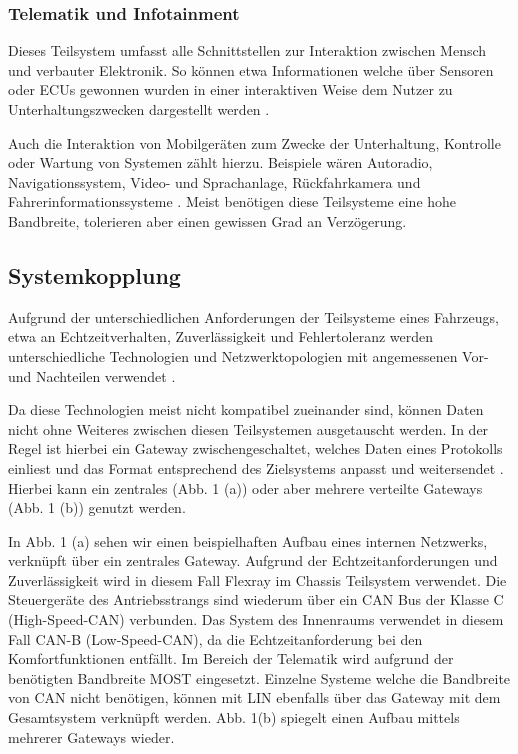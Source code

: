         \subsubsection{Telematik und Infotainment}
        Dieses Teilsystem umfasst alle Schnittstellen zur Interaktion zwischen Mensch und verbauter Elektronik. So können etwa Informationen welche über Sensoren
        oder ECUs gewonnen wurden in einer interaktiven Weise dem Nutzer zu Unterhaltungszwecken dargestellt werden \cite{TW_huang2018vehicle}.
        
        Auch die Interaktion von Mobilgeräten
        zum Zwecke der Unterhaltung, Kontrolle oder Wartung von Systemen zählt hierzu. Beispiele wären Autoradio, Navigationssystem, Video- und Sprachanlage, Rückfahrkamera und Fahrerinformationssysteme \cite{reif2011bosch}.
        Meist benötigen diese Teilsysteme eine hohe Bandbreite, tolerieren aber einen gewissen Grad an Verzögerung.
    \subsection{Systemkopplung}
    Aufgrund der unterschiedlichen Anforderungen der Teilsysteme eines Fahrzeugs, etwa an Echtzeitverhalten, Zuverlässigkeit und Fehlertoleranz werden unterschiedliche Technologien
    und Netzwerktopologien mit angemessenen Vor- und Nachteilen verwendet \cite{leen1999digital}. 
    
    Da diese Technologien meist nicht kompatibel zueinander sind, können Daten nicht ohne Weiteres zwischen diesen
    Teilsystemen ausgetauscht werden. In der Regel ist hierbei ein Gateway zwischengeschaltet, welches Daten eines Protokolls einliest und das Format entsprechend des Zielsystems anpasst
    und weitersendet \cite{reif2011bosch}\cite{TW_kim2014gateway}. Hierbei kann ein zentrales (Abb. 1 (a)) oder aber mehrere verteilte Gateways (Abb. 1 (b)) genutzt werden. 

    In Abb. 1 (a) sehen wir einen beispielhaften Aufbau eines internen Netzwerks, verknüpft über ein zentrales Gateway. Aufgrund der Echtzeitanforderungen und Zuverlässigkeit wird in diesem Fall Flexray
    im Chassis Teilsystem verwendet. Die Steuergeräte des Antriebsstrangs sind wiederum über ein CAN Bus der Klasse C (High-Speed-CAN) verbunden. Das System des Innenraums verwendet in diesem Fall 
    CAN-B (Low-Speed-CAN), da die Echtzeitanforderung bei den Komfortfunktionen entfällt. Im Bereich der Telematik wird aufgrund der benötigten Bandbreite MOST eingesetzt. Einzelne Systeme welche die
    Bandbreite von CAN nicht benötigen, können mit LIN ebenfalls über das Gateway mit dem Gesamtsystem verknüpft werden.
    Abb. 1(b) spiegelt einen Aufbau mittels mehrerer Gateways wieder.

